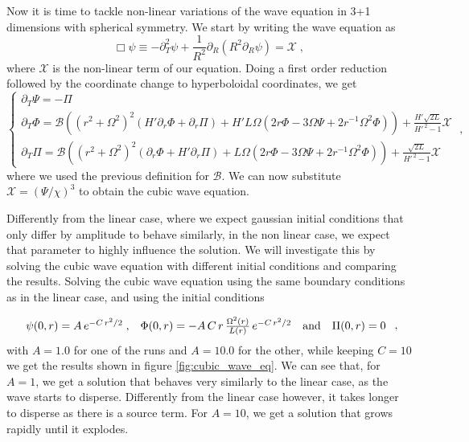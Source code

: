 Now it is time to tackle non-linear variations of the wave equation in 3+1 dimensions with spherical symmetry. We start by writing the wave equation as
\begin{equation}
    \Box \psi \equiv - \partial_T^2 \psi + \frac{1}{R^2} \partial_R\left( R^2 \partial_R \psi\right) = \mathcal{X} \;,
\end{equation}
where $\mathcal{X}$ is the non-linear term of our equation. Doing a first order reduction followed by the coordinate change to hyperboloidal coordinates, we get
\begin{equation}
    \left\{ \begin{array}{l} 
        \partial_T \Psi = - \Pi \\ 
        \partial_T \Phi = \mathcal{B}\left((r^2 + \Omega^2)^2 \left(H' \partial_r \Phi + \partial_r\Pi\right) + H' L \Omega \left( 2r\Phi - 3 \Omega \Psi + 2 r^{-1} \Omega^2 \Phi\right)\right) + \frac{H'\sqrt{2 L}}{H'^{\,2}-1} \mathcal{X} \\
        \partial_T \Pi = \mathcal{B}\left((r^2 + \Omega^2)^2 \left(\partial_r \Phi + H' \partial_r\Pi\right) + L \Omega \left( 2r\Phi - 3 \Omega \Psi + 2 r^{-1} \Omega^2 \Phi\right)\right) + \frac{\sqrt{2 L}}{H'^{\,2}-1} \mathcal{X}
        \end{array} \right. \; ,
\end{equation}
%
where we used the previous definition for $\mathcal{B}$. We can now substitute $\mathcal{X} = (\Psi /\chi)^3$ to obtain the cubic wave equation. 

Differently from the linear case, where we expect gaussian initial conditions that only differ by amplitude to behave similarly, in the non linear case, we expect that parameter to highly influence the solution. We will investigate this by solving the cubic wave equation with different initial conditions and comparing the results. Solving the cubic wave equation using the same boundary conditions as in the linear case, and using the initial conditions

\begin{equation}
    \begin{array}{c c c c}
        \psi(0,r) = A \, e^{-C \, r^2/2} \; , & \Phi(0,r) = - A \,C \, r \, \frac{\Omega^2(r)}{L(r)} \, e^{-C \, r^2/2} & \text{and} & \Pi(0,r) = 0
    \end{array} \; ,
    \label{eq:cubic_wave_equation-2nd_order_initial_conditions}
\end{equation}
%
with $A = 1.0$ for one of the runs and $A = 10.0$ for the other, while keeping $C = 10$ we get the results shown in figure \ref{fig:cubic_wave_eq}. We can see that, for $A = 1$, we get a solution that behaves very similarly to the linear case, as the wave starts to disperse. Differently from the linear case however, it takes longer to disperse as there is a source term. For $A = 10$, we get a solution that grows rapidly until it explodes.

